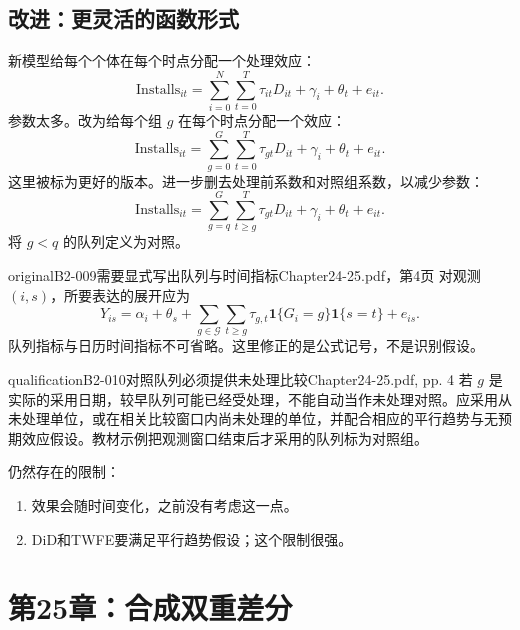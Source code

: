 \subsection{改进：更灵活的函数形式}
新模型给每个个体在每个时点分配一个处理效应：
\[
\mathrm{Installs}_{it}
 =\sum_{i=0}^{N}\sum_{t=0}^{T}\tau_{it}D_{it}+\gamma_i+\theta_t+e_{it}.
\]
参数太多。改为给每个组 \(g\) 在每个时点分配一个效应：
\[
\mathrm{Installs}_{it}
 =\sum_{g=0}^{G}\sum_{t=0}^{T}\tau_{gt}D_{it}+\gamma_i+\theta_t+e_{it}.
\]
这里被标为更好的版本。进一步删去处理前系数和对照组系数，以减少参数：
\[
\mathrm{Installs}_{it}
 =\sum_{g=q}^{G}\sum_{t\geq g}^{T}\tau_{gt}D_{it}+\gamma_i+\theta_t+e_{it}.
\]
将 \(g<q\) 的队列定义为对照。
\begin{reviewnote}{original}{B2-009}{需要显式写出队列与时间指标}{Chapter24-25.pdf，第4页}
对观测 \((i,s)\)，所要表达的展开应为
\[
Y_{is}=\alpha_i+\theta_s+
\sum_{g\in\mathcal G}\sum_{t\geq g}\tau_{g,t}
\mathbf1\{G_i=g\}\mathbf1\{s=t\}+e_{is}.
\]
队列指标与日历时间指标不可省略。这里修正的是公式记号，不是识别假设。
\par{}
\end{reviewnote}
\begin{reviewnote}{qualification}{B2-010}{对照队列必须提供未处理比较}{Chapter24-25.pdf, pp. 4}
若 \(g\) 是实际的采用日期，较早队列可能已经受处理，不能自动当作未处理对照。应采用从未处理单位，或在相关比较窗口内尚未处理的单位，并配合相应的平行趋势与无预期效应假设。教材示例把观测窗口结束后才采用的队列标为对照组。
\par{}
\end{reviewnote}

仍然存在的限制：
\begin{enumerate}
\item 效果会随时间变化，之前没有考虑这一点。
\item DiD和TWFE要满足平行趋势假设；这个限制很强。
\end{enumerate}

\section{第25章：合成双重差分}
